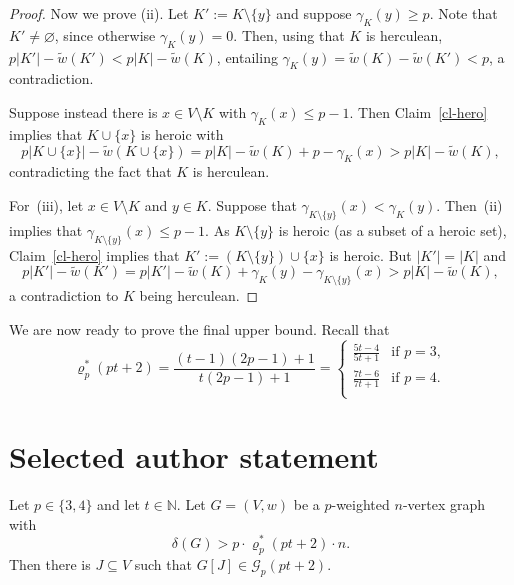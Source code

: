 \documentclass[10pt,a4paper]{amsart}
\newcommand{\cG}{\mathcal{G}}
\begin{document}
\begin{proof}
	Now we prove (ii). Let $K' := K\setminus\lbrace y \rbrace$ and suppose $\gamma_K(y) \geq p$. Note that $K'\neq\varnothing$, since otherwise $\gamma_K(y)=0$. Then, using that $K$ is herculean, $p|K'|-\tilde{w}(K')<p|K|-\tilde{w}(K)$, entailing
	$\gamma_K(y)=\tilde{w}(K)-\tilde{w}(K')<p$, a contradiction.
	
	Suppose instead there is $x \in V\setminus K$ with $\gamma_K(x) \leq p-1$.
	Then Claim~\ref{cl-hero} implies that $K \cup\lbrace x\rbrace$ is heroic with 
	$$p|K \cup \lbrace x\rbrace| - \tilde{w}(K \cup \lbrace x\rbrace)=p|K|-\tilde{w}(K)+p-\gamma_K(x)>p|K|-\tilde{w}(K),$$ 
	contradicting the fact that $K$ is herculean.
	
	For~(iii), let $x \in V\setminus K$ and $y \in K$.
	Suppose that $\gamma_{K\setminus\{y\}}(x) < \gamma_K(y)$.
	Then~(ii) implies that $\gamma_{K\setminus\{y\}}(x) \leq p-1$.
	As $K\setminus\lbrace y \rbrace$ is heroic (as a subset of a heroic set), Claim~\ref{cl-hero} implies that $K' := (K\setminus\lbrace y \rbrace)\cup\lbrace x\rbrace$ is heroic. But $|K'|=|K|$ and 
	$$p|K'|-\tilde{w}(K') = p|K'|-\tilde{w}(K)+\gamma_K(y)-\gamma_{K\setminus\{y\}}(x) > p|K|-\tilde{w}(K),$$ 
	a contradiction to $K$ being herculean. 
\end{proof}

We are now ready to prove the final upper bound.
Recall that
$$
\varrho^*_p(pt+2) = \frac{(t-1)(2p-1)+1}{t(2p-1)+1} =
\begin{cases}
	\frac{5t-4}{5t+1} &\text{if }p=3,\\
	\frac{7t-6}{7t+1} &\text{if }p=4.\\
\end{cases}
$$
\section*{Selected author statement}
\begin{lemma}\label{smallp}
	Let $p \in\lbrace 3,4\rbrace$ and let $t\in\mathbb{N}$.
	Let $G=(V,w)$ be a $p$-weighted $n$-vertex graph with
	$$\delta(G)>p \cdot \varrho_p^*(pt+2) \cdot n.$$
	Then there is $J \subseteq V$ such that $G[J] \in \cG_p(pt+2)$.
\end{lemma}
\end{document}
